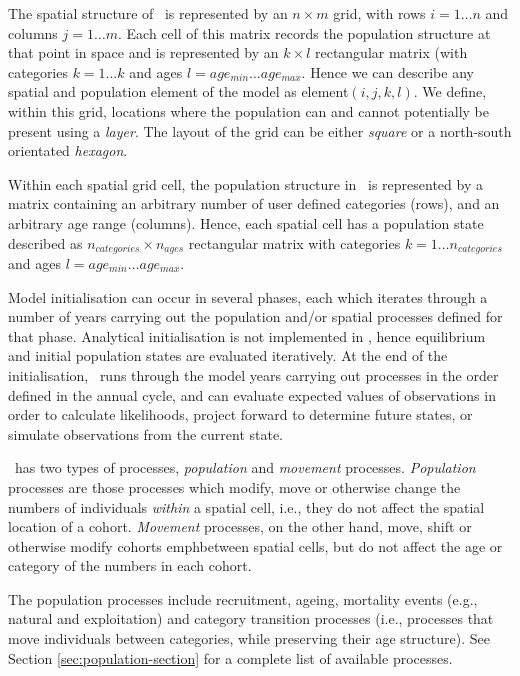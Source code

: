 The spatial structure of \SPM\ is represented by an $n \times m$ grid, with rows $i=1 \dots n$ and columns $j=1 \ldots m$. Each cell of this matrix records the population structure at that point in space and is represented by an $k \times l$ rectangular matrix (with categories $k=1 \ldots k$ and ages $l=age_{min} \ldots age_{max}$. Hence we can describe any spatial and population element of the model as element$(i,j,k,l)$. We define, within this grid, locations where the population can and cannot potentially be present using a \emph{layer}. The layout of the grid can be either \emph{square} or a north-south orientated \emph{hexagon}.

Within each spatial grid cell, the population structure in \SPM\ is represented by a matrix containing an arbitrary number of user defined categories (rows), and an arbitrary age range (columns). Hence, each spatial cell has a population state described as $n_{categories} \times n_{ages}$ rectangular matrix with categories $k=1 \ldots n_{categories}$ and ages $l=age_{min} \ldots age_{max}$. 

Model initialisation can occur in several phases, each which iterates through a number of years carrying out the population and/or spatial processes defined for that phase. Analytical initialisation is not implemented in \SPM, hence equilibrium and initial population states are evaluated iteratively. At the end of the initialisation, \SPM\ runs through the model years carrying out processes in the order defined in the annual cycle, and can evaluate expected values of observations in order to calculate likelihoods, project forward to determine future states, or simulate observations from the current state.

\SPM\ has two types of processes, \emph{population} and \emph{movement} processes. \emph{Population} processes are those processes which modify, move or otherwise change the numbers of individuals \emph{within} a spatial cell, i.e., they do not affect the spatial location of a cohort. \emph{Movement} processes, on the other hand, move, shift or otherwise modify cohorts emph{between} spatial cells, but do not affect the age or category of the numbers in each cohort. 

The population processes include recruitment, ageing,  mortality events (e.g., natural and exploitation) and category transition processes (i.e., processes that move individuals between categories, while preserving their age structure). See Section \ref{sec:population-section} for a complete list of available processes.

